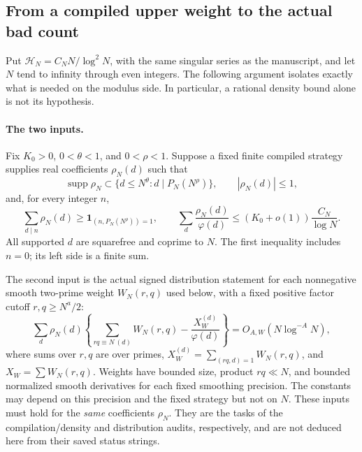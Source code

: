 \subsection{From a compiled upper weight to the actual bad count}
\label{sec:actual-k-positive-assembly}

Put $\mathcal H_N=C_NN/\log^2N$, with the same singular series as
the manuscript, and let $N$ tend to infinity through even integers.
The following argument isolates exactly what is needed on the modulus
side. In particular, a rational density bound alone is not its hypothesis.

\paragraph{The two inputs.}
Fix $K_0>0$, $0<\theta<1$, and $0<\rho<1$. Suppose a fixed finite
compiled strategy supplies real coefficients $\rho_N(d)$ such that
\[
 \operatorname{supp}\rho_N\subset
 \{d\le N^\theta:d\mid P_N(N^\rho)\},\qquad |\rho_N(d)|\le1,
\]
and, for every integer $n$,
\begin{equation}\label{eq:actual-k-majorant-input}
 \sum_{d\mid n}\rho_N(d)\ge
 \mathbf1_{(n,P_N(N^\rho))=1},\qquad
 \sum_d\frac{\rho_N(d)}{\varphi(d)}
 \le (K_0+o(1))\frac{C_N}{\log N}.
\end{equation}
All supported $d$ are squarefree and coprime to $N$. The first
inequality includes $n=0$; its left side is a finite sum.

The second input is the actual signed distribution statement for
each nonnegative smooth two-prime weight $W_N(r,q)$ used below,
with a fixed positive factor cutoff $r,q\ge N^a/2$:
\begin{equation}\label{eq:actual-k-distribution-input}
 \sum_d\rho_N(d)\left\{
 \sum_{rq\equiv N\ (d)}W_N(r,q)
       -\frac{X_W^{(d)}}{\varphi(d)}\right\}
 =O_{A,W}(N\log^{-A}N),
\end{equation}
where sums over $r,q$ are over primes,
$X_W^{(d)}=\sum_{(rq,d)=1}W_N(r,q)$, and $X_W=\sum W_N(r,q)$.
Weights have bounded size, product $rq\ll N$, and bounded normalized
smooth derivatives for each fixed smoothing precision. The constants
may depend on this precision and the fixed strategy but not on $N$.
These inputs must hold for the \emph{same} coefficients $\rho_N$.
They are the tasks of the compilation/density and distribution audits,
respectively, and are not deduced here from their saved status strings.

